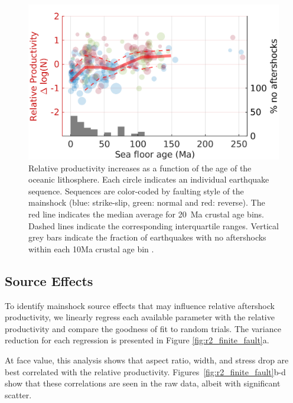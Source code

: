 \documentclass[draft, jgrga]{agujournal2018}
\begin{document}
    \begin{figure}
        \centering
        \includegraphics{figures/prod_vs_age.png}
        \caption{Relative productivity increases as a function of the age of the oceanic lithosphere. Each circle indicates an individual earthquake sequence. Sequences are color-coded by faulting style of the mainshock (blue: strike-slip, green: normal and red: reverse). The red line indicates the median average for 20~Ma crustal age bins. Dashed lines indicate the corresponding interquartile ranges. Vertical grey bars indicate the fraction of earthquakes with no aftershocks within each 10Ma crustal age bin .}
        \label{fig:prod_vs_age}
    \end{figure}
    
    \subsection{Source Effects}\label{sec:source_parameters}

    To identify mainshock source effects that may influence relative aftershock productivity, we linearly regress each available parameter with the relative productivity and compare the goodness of fit to random trials. The variance reduction for each regression is presented in Figure \ref{fig:r2_finite_fault}a. 
    
    At face value, this analysis shows that aspect ratio, width, and stress drop are best correlated with the relative productivity. Figures~\ref{fig:r2_finite_fault}b-d show that these correlations are seen in the raw data, albeit with significant scatter. 
    
\end{document}
